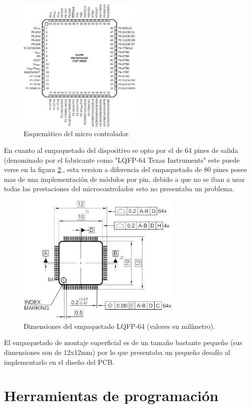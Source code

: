 \begin{figure}[!h]
	\centering
	\includegraphics[width=60mm,keepaspectratio]{Figures/microdatasheet1.png}
	\caption{Esquemático del micro controlador.}
	\label{fig:msp430squematic}
\end{figure}

En cuanto al empaquetado del dispositivo se opto por el de 64 pines de salida (denominado por el fabricante como "LQFP-64 Texas Instruments" este puede verse en la figura \ref{fig:paquet64}., esta version a diferencia del empaquetado de 80 pines posee mas de una implementación de módulos por pin, debido a que no se iban a usar todas las prestaciones del microcontrolador esto no presentaba un problema. 

\begin{figure}[!h]
	\centering
	\includegraphics[width=80mm,keepaspectratio]{Figures/PG-LQFP-64-18.png}
	\caption{Dimensiones del empaquetado LQFP-64 (valores en milímetro).}
	\label{fig:paquet64}
\end{figure}

El empaquetado de montaje superficial es de un tamaño bastante pequeño (sus dimensiones son de 12x12mm) por lo que presentaba un pequeño desafío al implementarlo en el diseño del PCB.


\section{Herramientas de programación}
\label{sec:cap2parte2}
